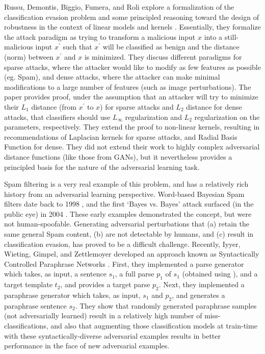 \documentclass[11pt]{article}
\begin{document}
Russu, Demontis, Biggio, Fumera, and Roli explore a formalization of the classification evasion problem and some principled reasoning toward the design of robustness in the context of linear models and kernels \cite{russu2016secure}.  Essentially, they formalize the attack paradigm as trying to transform a malicious input $x$ into a still-malicious input $x^\prime$ such that $x^\prime$ will be classified as benign and the distance (norm) between $x^\prime$ and $x$ is minimized.  They discuss different paradigms for sparse attacks, where the attacker would like to modify as few features as possible (eg. Spam), and dense attacks, where the attacker can make minimal modifications to a large number of features (such as image perturbations).  The paper provides proof, under the assumption that an attacker will try to minimize their $L_1$ distance (from $x^\prime$ to $x$) for sparse attacks and $L_2$ distance for dense attacks, that classifiers should use $L_{\infty}$ regularization and $L_2$ regularization on the parameters, respectively.  They extend the proof to non-linear kernels, resulting in recommendations of Laplacian kernels for sparse attacks, and Radial Basis Function for dense.  They did not extend their work to highly complex adversarial distance functions (like those from GANs), but it nevertheless provides a principled basis for the nature of the adversarial learning task.

Spam filtering is a very real example of this problem, and has a relatively rich history from an adversarial learning perspective.  Word-based Bayesian Spam filters date back to 1998 \cite{sahami1998bayesian}, and the first `Bayes vs. Bayes' attack surfaced (in the public eye) in 2004 \cite{graham2004beat}.  These early examples demonstrated the concept, but were not human-spoofable.  Generating adversarial perturbations that (a) retain the same general Spam content, (b) are not detectable by humans, and (c) result in classification evasion, has proved to be a difficult challenge.  Recently, Iyyer, Wieting, Gimpel, and Zettlemoyer developed an approach known as Syntactically Controlled Paraphrase Networks \cite{DBLP:journals/corr/abs-1804-06059}.  First, they implemented a parse generator which takes, as input, a sentence $s_1$, a full parse $p_1$ of $s_1$ (obtained using \cite{manning2014stanford}), and a target template $t_2$, and provides a target parse $p_2$.  Next, they implemented a paraphrase generator which takes, as input, $s_1$ and $p_2$, and generates a paraphrase sentence $s_2$.  They show that randomly generated paraphrase samples (not adversarially learned) result in a relatively high number of miss-classifications, and also that augmenting those classification models at train-time with these syntactically-diverse adversarial examples results in better performance in the face of new adversarial examples.
\end{document}
